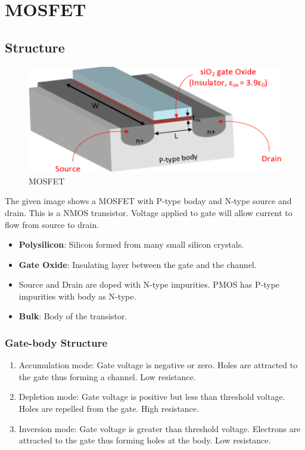 \section{MOSFET}

\subsection{Structure}

\begin{figure}
    \centering
    \includegraphics[scale=0.5]{images/MOSFET.png}
    \caption{MOSFET}
\end{figure}

The given image shows a MOSFET with P-type boday and N-type source and drain.
This is a NMOS transistor. Voltage applied to gate will allow current to flow
from source to drain.

\begin{itemize}
    \item \textbf{Polysilicon}: Silicon formed from many small silicon crystals.
    \item \textbf{Gate Oxide}: Insulating layer between the gate and the channel.
    \item Source and Drain are doped with N-type impurities. PMOS has P-type impurities
    with body as N-type.
    \item \textbf{Bulk}: Body of the transistor.
\end{itemize}

\subsubsection{Gate-body Structure}
\begin{enumerate}
    \item Accumulation mode: Gate voltage is negative or zero. Holes are attracted to the gate thus forming a channel. Low resistance.
    \item Depletion mode: Gate voltage is positive but less than threshold voltage. Holes are repelled from the gate. High resistance.
    \item Inversion mode: Gate voltage is greater than threshold voltage. Electrons are attracted to the gate thus forming holes at the body. Low resistance.
\end{enumerate}

